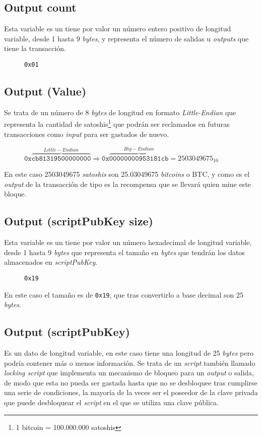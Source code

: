 \documentclass{article}
\begin{document}
    \subsection{Output count}
    Esta variable es un tiene por valor un número entero positivo de longitud variable, desde 1 hasta 9 \textit{bytes}, y representa el número de salidas u \textit{outputs} que tiene la transacción.
    \begin{figure}[H]
        \texttt{0x01}
    \end{figure}
    
    \subsection{Output (Value)}
    Se trata de un número de 8 \textit{bytes} de longitud en formato \textit{Little-Endian} que representa la cantidad de satoshis\footnote{1 bitcoin = 100.000.000 satoshis} que podrán ser reclamados en futuras transacciones como \textit{input} para ser gastados de nuevo.
    \begin{figure}[H]
    \centering
        $\texttt{0x}\overbrace{\texttt{cb81319500000000}}^{Little-Endian} \Rightarrow \texttt{0x}\overbrace{\texttt{00000000953181cb}}^{Big-Endian} = 2503049675_{10}$
    \end{figure}
    
    En este caso 2503049675 \textit{satoshis} son 25.03049675 \textit{bitcoins} o BTC, y como es el \textit{output} de la transacción de tipo  es la recompensa que se llevará quien mine este bloque.
    
    \subsection{Output (scriptPubKey size)}
    Esta variable es un tiene por valor un número hexadecimal de longitud variable, desde 1 hasta 9 \textit{bytes} que representa el tamaño en \textit{bytes} que tendrán los datos almacenados en \textit{scriptPubKey}.
    \begin{figure}[H]
        \texttt{0x19}
    \end{figure}
    En este caso el tamaño es de \texttt{0x19}, que tras convertirlo a base decimal son 25 \textit{bytes}.
    
    \subsection{Output (scriptPubKey)}
    Es un dato de longitud variable, en este caso tiene una longitud de 25 \textit{bytes} pero podría contener más o menos información. Se trata de un \textit{script} también llamado \textit{locking script} que implementa un mecanismo de bloqueo para un \textit{output} o salida, de modo que esta no pueda ser gastada hasta que no se desbloquee tras cumplirse una serie de condiciones, la mayoría de la veces ser el poseedor de la clave privada que puede desbloquear el \textit{script} en el que se utiliza una clave pública.
    
\end{document}
